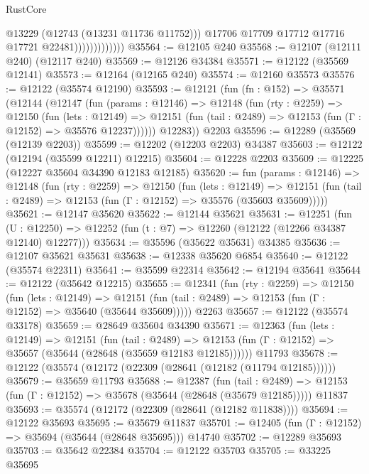 \begin{lexlean}{RustCore}
\begin{coremodule}
                                @13229
                                (@12743 (@13231 @11736 @11752)))
                              @17706
                              @17709
                              @17712
                              @17716
                              @17721
                              @22481)))))))))))))
@35564 := @12105 @240
@35568 := @12107 (@12111 @240) (@12117 @240)
@35569 := @12126 @34384
@35571 := @12122 (@35569 @12141)
@35573 := @12164 (@12165 @240)
@35574 := @12160 @35573
@35576 := @12122 (@35574 @12190)
@35593 := @12121
    (fun (fn : @152) =>
    @35571
      (@12144
        (@12147
          (fun (params : @12146) =>
          @12148
            (fun (rty : @2259) =>
            @12150
              (fun (lets : @12149) =>
              @12151 (fun (tail : @2489) => @12153 (fun (Γ : @12152) => @35576 @12237))))))
        @12283))
    @2203
@35596 := @12289 (@35569 (@12139 @2203))
@35599 := @12202 (@12203 @2203) @34387
@35603 := @12122 (@12194 (@35599 @12211) @12215)
@35604 := @12228 @2203
@35609 := @12225 (@12227 @35604 @34390 @12183 @12185)
@35620 := fun (params : @12146) =>
  @12148
    (fun (rty : @2259) =>
    @12150
      (fun (lets : @12149) =>
      @12151 (fun (tail : @2489) => @12153 (fun (Γ : @12152) => @35576 (@35603 @35609)))))
@35621 := @12147 @35620
@35622 := @12144 @35621
@35631 := @12251
    (fun (U : @12250) => @12252 (fun (t : @7) => @12260 (@12122 (@12266 @34387 @12140) @12277)))
@35634 := @35596 (@35622 @35631) @34385
@35636 := @12107 @35621 @35631
@35638 := @12338 @35620 @6854
@35640 := @12122 (@35574 @22311)
@35641 := @35599 @22314
@35642 := @12194 @35641
@35644 := @12122 (@35642 @12215)
@35655 := @12341
    (fun (rty : @2259) =>
    @12150
      (fun (lets : @12149) =>
      @12151 (fun (tail : @2489) => @12153 (fun (Γ : @12152) => @35640 (@35644 @35609)))))
    @2263
@35657 := @12122 (@35574 @33178)
@35659 := @28649 @35604 @34390
@35671 := @12363
    (fun (lets : @12149) =>
    @12151
      (fun (tail : @2489) =>
      @12153 (fun (Γ : @12152) => @35657 (@35644 (@28648 (@35659 @12183 @12185))))))
    @11793
@35678 := @12122 (@35574 (@12172 (@22309 (@28641 (@12182 (@11794 @12185))))))
@35679 := @35659 @11793
@35688 := @12387
    (fun (tail : @2489) => @12153 (fun (Γ : @12152) => @35678 (@35644 (@28648 (@35679 @12185)))))
    @11837
@35693 := @35574 (@12172 (@22309 (@28641 (@12182 @11838))))
@35694 := @12122 @35693
@35695 := @35679 @11837
@35701 := @12405 (fun (Γ : @12152) => @35694 (@35644 (@28648 @35695))) @14740
@35702 := @12289 @35693
@35703 := @35642 @22384
@35704 := @12122 @35703
@35705 := @33225 @35695

\end{coremodule}
\end{lexlean}
